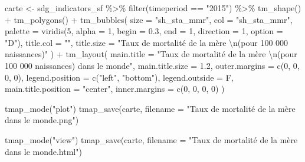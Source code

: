 \documentclass[
]{book}
\newenvironment{Shaded}{\begin{snugshade}}{\end{snugshade}}
\newcommand{\AttributeTok}[1]{\textcolor[rgb]{0.77,0.63,0.00}{#1}}
\newcommand{\DecValTok}[1]{\textcolor[rgb]{0.00,0.00,0.81}{#1}}
\newcommand{\FloatTok}[1]{\textcolor[rgb]{0.00,0.00,0.81}{#1}}
\newcommand{\FunctionTok}[1]{\textcolor[rgb]{0.00,0.00,0.00}{#1}}
\newcommand{\NormalTok}[1]{#1}
\newcommand{\OtherTok}[1]{\textcolor[rgb]{0.56,0.35,0.01}{#1}}
\newcommand{\SpecialCharTok}[1]{\textcolor[rgb]{0.00,0.00,0.00}{#1}}
\newcommand{\StringTok}[1]{\textcolor[rgb]{0.31,0.60,0.02}{#1}}
\begin{document}
\begin{Shaded}
\begin{Highlighting}[]
\NormalTok{carte }\OtherTok{\textless{}{-}}\NormalTok{ sdg\_indicators\_sf }\SpecialCharTok{\%\textgreater{}\%}
  \FunctionTok{filter}\NormalTok{(timeperiod }\SpecialCharTok{==} \StringTok{"2015"}\NormalTok{) }\SpecialCharTok{\%\textgreater{}\%}
  \FunctionTok{tm\_shape}\NormalTok{() }\SpecialCharTok{+}
  \FunctionTok{tm\_polygons}\NormalTok{() }\SpecialCharTok{+}
  \FunctionTok{tm\_bubbles}\NormalTok{(}
    \AttributeTok{size =} \StringTok{"sh\_sta\_mmr"}\NormalTok{, }\AttributeTok{col =} \StringTok{"sh\_sta\_mmr"}\NormalTok{,}
    \AttributeTok{palette =} \FunctionTok{viridis}\NormalTok{(}\DecValTok{5}\NormalTok{, }\AttributeTok{alpha =} \DecValTok{1}\NormalTok{, }\AttributeTok{begin =} \FloatTok{0.3}\NormalTok{, }\AttributeTok{end =} \DecValTok{1}\NormalTok{, }\AttributeTok{direction =} \DecValTok{1}\NormalTok{, }\AttributeTok{option =} \StringTok{"D"}\NormalTok{),}
    \AttributeTok{title.col =} \StringTok{""}\NormalTok{,}
    \AttributeTok{title.size =} \StringTok{"Taux de mortalité de la mère }\SpecialCharTok{\textbackslash{}n}\StringTok{(pour 100 000 naissances)"}
\NormalTok{  ) }\SpecialCharTok{+}
  \FunctionTok{tm\_layout}\NormalTok{(}
    \AttributeTok{main.title =} \StringTok{"Taux de mortalité de la mère }\SpecialCharTok{\textbackslash{}n}\StringTok{(pour 100 000 naissances) dans le monde"}\NormalTok{,}
    \AttributeTok{main.title.size =} \FloatTok{1.2}\NormalTok{,}
    \AttributeTok{outer.margins =} \FunctionTok{c}\NormalTok{(}\DecValTok{0}\NormalTok{, }\DecValTok{0}\NormalTok{, }\DecValTok{0}\NormalTok{, }\DecValTok{0}\NormalTok{),}
    \AttributeTok{legend.position =} \FunctionTok{c}\NormalTok{(}\StringTok{"left"}\NormalTok{, }\StringTok{"bottom"}\NormalTok{),}
    \AttributeTok{legend.outside =}\NormalTok{ F,}
    \AttributeTok{main.title.position =} \StringTok{"center"}\NormalTok{,}
    \AttributeTok{inner.margins =} \FunctionTok{c}\NormalTok{(}\DecValTok{0}\NormalTok{, }\DecValTok{0}\NormalTok{, }\DecValTok{0}\NormalTok{, }\DecValTok{0}\NormalTok{)}
\NormalTok{  )}

\FunctionTok{tmap\_mode}\NormalTok{(}\StringTok{"plot"}\NormalTok{)}
\FunctionTok{tmap\_save}\NormalTok{(carte, }\AttributeTok{filename =} \StringTok{"Taux de mortalité de la mère dans le monde.png"}\NormalTok{)}

\FunctionTok{tmap\_mode}\NormalTok{(}\StringTok{"view"}\NormalTok{)}
\FunctionTok{tmap\_save}\NormalTok{(carte, }\AttributeTok{filename =} \StringTok{"Taux de mortalité de la mère dans le monde.html"}\NormalTok{)}\StringTok{\textasciigrave{}\textasciigrave{}\textasciigrave{}}
\end{Highlighting}
\end{Shaded}
\end{document}
